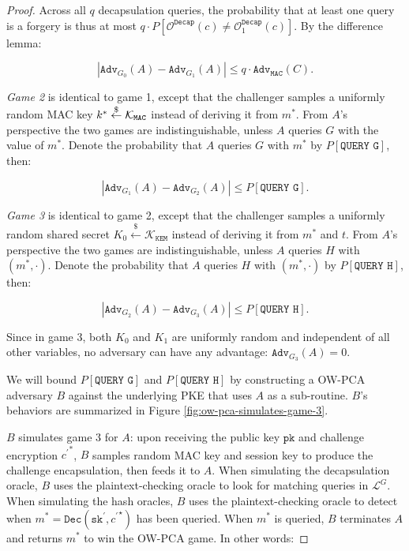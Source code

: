 \documentclass[letterpaper,12pt,titlepage,oneside,final]{book}
\newcommand{\decrypt}{\texttt{Dec}}
\newcommand{\kem}{\texttt{KEM}}
\newcommand{\decap}{\texttt{Decap}}
\newcommand{\mac}{\texttt{\texttt{MAC}}}
\newcommand{\pk}{\texttt{pk}}
\newcommand{\sk}{\texttt{sk}}
\newcommand{\leftsample}{\stackrel{\$}{\leftarrow}}
\newcommand{\adv}{\texttt{Adv}}
\begin{document}
\begin{proof}
    Across all $q$ decapsulation queries, the probability that at least one query is a forgery is thus at most $q \cdot P\left[\mathcal{O}^\decap(c) \neq \mathcal{O}^\decap_1(c)\right]$. By the difference lemma:

    \begin{equation*}
        \left\vert \adv_{G_0}(A) - \adv_{G_1}(A) \right\vert\leq q\cdot  \adv_\texttt{MAC}(C).
    \end{equation*}

    \emph{Game 2} is identical to game 1, except that the challenger samples a uniformly random MAC key $k^\ast \leftsample \mathcal{K}_\mac$ instead of deriving it from $m^\ast$. From $A$'s perspective the two games are indistinguishable, unless $A$ queries $G$ with the value of $m^\ast$. Denote the probability that $A$ queries $G$ with $m^\ast$ by $P[\texttt{QUERY G}]$, then:

    \begin{equation*}
        \left\vert \adv_{G_1}(A) - \adv_{G_2}(A) \right\vert \leq P\left[\texttt{QUERY G}\right].
    \end{equation*}

    \emph{Game 3} is identical to game 2, except that the challenger samples a uniformly random shared secret $K_0 \leftsample \mathcal{K}_\kem$ instead of deriving it from $m^\ast$ and $t$. From $A$'s perspective the two games are indistinguishable, unless $A$ queries $H$ with $(m^\ast, \cdot)$. Denote the probability that $A$ queries $H$ with $(m^\ast, \cdot)$ by $P[\texttt{QUERY H}]$, then:

    \begin{equation*}
        \left\vert \adv_{G_2}(A) - \adv_{G_3}(A) \right\vert \leq P\left[\texttt{QUERY H}\right].
    \end{equation*}

    Since in game 3, both $K_0$ and $K_1$ are uniformly random and independent of all other variables, no adversary can have any advantage: $\adv_{G_3}(A) = 0$.

    We will bound $P[\texttt{QUERY G}]$ and $P[\texttt{QUERY H}]$ by constructing a OW-PCA adversary $B$ against the underlying PKE that uses $A$ as a sub-routine. $B$'s behaviors are summarized in Figure \ref{fig:ow-pca-simulates-game-3}.

    $B$ simulates game 3 for $A$: upon receiving the public key $\pk$ and challenge encryption ${c^\prime}^\ast$, $B$ samples random MAC key and session key to produce the challenge encapsulation, then feeds it to $A$. When simulating the decapsulation oracle, $B$ uses the plaintext-checking oracle to look for matching queries in $\mathcal{L}^G$. When simulating the hash oracles, $B$ uses the plaintext-checking oracle to detect when $m^\ast = \decrypt(\sk^\prime, {c^\prime}^\star)$ has been queried. When $m^\ast$ is queried, $B$ terminates $A$ and returns $m^\ast$ to win the OW-PCA game. In other words:


\end{proof}
\end{document}
